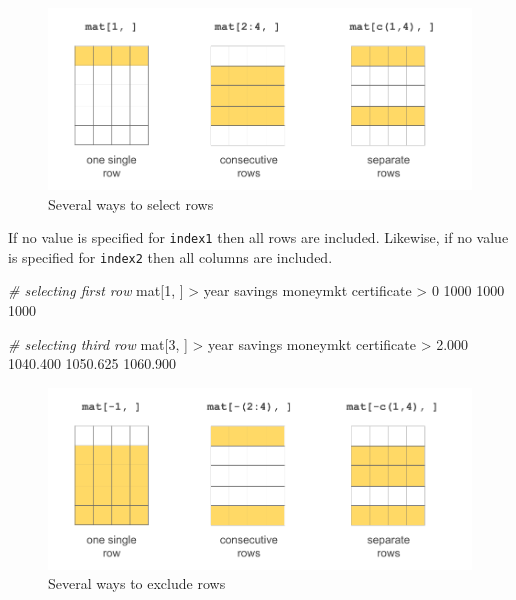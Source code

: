 \documentclass[
]{book}
\newenvironment{Shaded}{\begin{snugshade}}{\end{snugshade}}
\newcommand{\CommentTok}[1]{\textcolor[rgb]{0.56,0.35,0.01}{\textit{#1}}}
\newcommand{\DecValTok}[1]{\textcolor[rgb]{0.00,0.00,0.81}{#1}}
\newcommand{\FloatTok}[1]{\textcolor[rgb]{0.00,0.00,0.81}{#1}}
\newcommand{\NormalTok}[1]{#1}
\newcommand{\SpecialCharTok}[1]{\textcolor[rgb]{0.00,0.00,0.00}{#1}}
\begin{document}
\begin{figure}

{\centering \includegraphics[width=0.8\linewidth]{images/objects/obj-matrix-rows1} 

}

\caption{Several ways to select rows}\label{fig:unnamed-chunk-129}
\end{figure}

If no value is specified for \texttt{index1} then all rows are included. Likewise,
if no value is specified for \texttt{index2} then all columns are included.

\begin{Shaded}
\begin{Highlighting}[]
\CommentTok{\# selecting first row}
\NormalTok{mat[}\DecValTok{1}\NormalTok{, ]}
\SpecialCharTok{\textgreater{}}\NormalTok{        year     savings    moneymkt certificate }
\SpecialCharTok{\textgreater{}}           \DecValTok{0}        \DecValTok{1000}        \DecValTok{1000}        \DecValTok{1000}

\CommentTok{\# selecting third row}
\NormalTok{mat[}\DecValTok{3}\NormalTok{, ]}
\SpecialCharTok{\textgreater{}}\NormalTok{        year     savings    moneymkt certificate }
\SpecialCharTok{\textgreater{}}       \FloatTok{2.000}    \FloatTok{1040.400}    \FloatTok{1050.625}    \FloatTok{1060.900}
\end{Highlighting}
\end{Shaded}

\begin{figure}

{\centering \includegraphics[width=0.8\linewidth]{images/objects/obj-matrix-rows2} 

}

\caption{Several ways to exclude rows}\label{fig:unnamed-chunk-131}
\end{figure}
\end{document}
